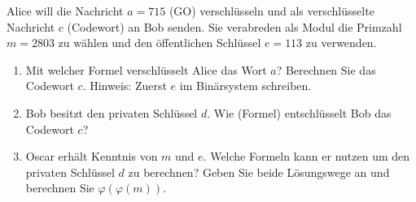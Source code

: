 \begin{aufgabe}
Alice will die Nachricht $a = 715$ (GO) verschlüsseln und als verschlüsselte Nachricht $c$ (Codewort) an Bob senden. Sie verabreden als Modul die Primzahl $m = 2803$ zu wählen und den öffentlichen Schlüssel $e = 113$ zu verwenden.
\begin{enumerate}[label=\alph*)]
  \item Mit welcher Formel verschlüsselt Alice das Wort $a$? Berechnen Sie das Codewort $c$. Hinweis: Zuerst $e$ im Binärsystem schreiben.
  \item Bob besitzt den privaten Schlüssel $d$. Wie (Formel) entschlüsselt Bob das Codewort $c$?
  \item Oscar erhält Kenntnis von $m$ und $e$. Welche Formeln kann er nutzen um den privaten Schlüssel $d$ zu berechnen? Geben Sie beide Lösungswege an und berechnen Sie $\varphi(\varphi(m))$.
\end{enumerate}
\end{aufgabe}
